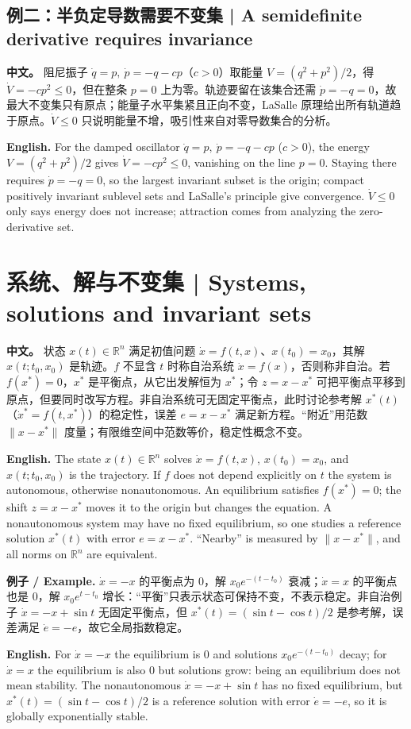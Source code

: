 \documentclass[UTF8,11pt,a4paper]{ctexart}
\newcommand{\EN}[1]{\par\noindent\textbf{English.} #1\par}
\newcommand{\EX}[2]{\par\noindent\textbf{例子 / Example.} #1\par\EN{#2}}
\newcommand{\APS}[2]{\par\noindent\textbf{中文。} #1\par\noindent\textbf{English.} #2\par}
\newcommand{\R}{\mathbb{R}}\newcommand{\N}{\mathbb{N}}
\newcommand{\norm}[1]{\lVert #1\rVert}\newcommand{\abs}[1]{\lvert #1\rvert}
\begin{document}
\subsection*{例二：半负定导数需要不变集 | A semidefinite derivative requires invariance}
\APS{阻尼振子 $\dot q=p,\ \dot p=-q-cp$（$c>0$）取能量 $V=(q^2+p^2)/2$，得 $\dot V=-cp^2\le0$，但在整条 $p=0$ 上为零。轨迹要留在该集合还需 $\dot p=-q=0$，故最大不变集只有原点；能量子水平集紧且正向不变，LaSalle 原理给出所有轨道趋于原点。$\dot V\le0$ 只说明能量不增，吸引性来自对零导数集合的分析。}{For the damped oscillator $\dot q=p,\ \dot p=-q-cp$ ($c>0$), the energy $V=(q^2+p^2)/2$ gives $\dot V=-cp^2\le0$, vanishing on the line $p=0$. Staying there requires $\dot p=-q=0$, so the largest invariant subset is the origin; compact positively invariant sublevel sets and LaSalle's principle give convergence. $\dot V\le0$ only says energy does not increase; attraction comes from analyzing the zero-derivative set.}

\section{系统、解与不变集 | Systems, solutions and invariant sets}
\APS{状态 $x(t)\in\R^n$ 满足初值问题 $\dot x=f(t,x)$、$x(t_0)=x_0$，其解 $x(t;t_0,x_0)$ 是轨迹。$f$ 不显含 $t$ 时称自治系统 $\dot x=f(x)$，否则称非自治。若 $f(x^*)=0$，$x^*$ 是平衡点，从它出发解恒为 $x^*$；令 $z=x-x^*$ 可把平衡点平移到原点，但要同时改写方程。非自治系统可无固定平衡点，此时讨论参考解 $x^*(t)$（$\dot x^*=f(t,x^*)$）的稳定性，误差 $e=x-x^*$ 满足新方程。“附近”用范数 $\norm{x-x^*}$ 度量；有限维空间中范数等价，稳定性概念不变。}{The state $x(t)\in\R^n$ solves $\dot x=f(t,x)$, $x(t_0)=x_0$, and $x(t;t_0,x_0)$ is the trajectory. If $f$ does not depend explicitly on $t$ the system is autonomous, otherwise nonautonomous. An equilibrium satisfies $f(x^*)=0$; the shift $z=x-x^*$ moves it to the origin but changes the equation. A nonautonomous system may have no fixed equilibrium, so one studies a reference solution $x^*(t)$ with error $e=x-x^*$. “Nearby” is measured by $\norm{x-x^*}$, and all norms on $\R^n$ are equivalent.}

\EX{$\dot x=-x$ 的平衡点为 $0$，解 $x_0e^{-(t-t_0)}$ 衰减；$\dot x=x$ 的平衡点也是 $0$，解 $x_0e^{t-t_0}$ 增长：“平衡”只表示状态可保持不变，不表示稳定。非自治例子 $\dot x=-x+\sin t$ 无固定平衡点，但 $x^*(t)=(\sin t-\cos t)/2$ 是参考解，误差满足 $\dot e=-e$，故它全局指数稳定。}{For $\dot x=-x$ the equilibrium is $0$ and solutions $x_0e^{-(t-t_0)}$ decay; for $\dot x=x$ the equilibrium is also $0$ but solutions grow: being an equilibrium does not mean stability. The nonautonomous $\dot x=-x+\sin t$ has no fixed equilibrium, but $x^*(t)=(\sin t-\cos t)/2$ is a reference solution with error $\dot e=-e$, so it is globally exponentially stable.}
\end{document}
